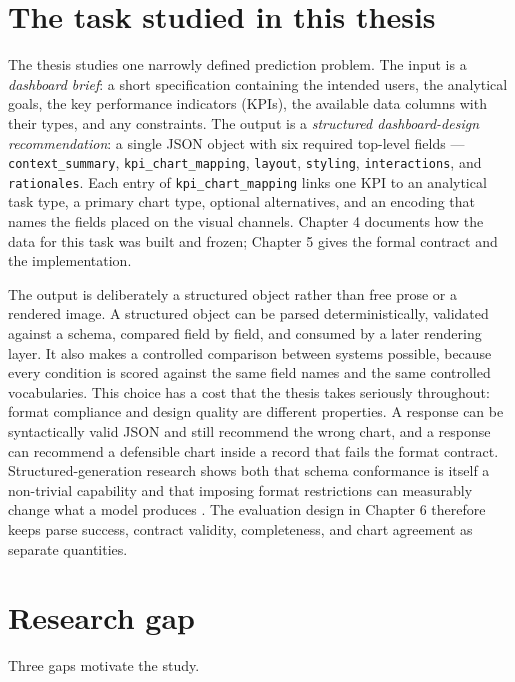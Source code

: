 \section{The task studied in this thesis}

The thesis studies one narrowly defined prediction problem. The input is a \emph{dashboard brief}: a short specification containing the intended users, the analytical goals, the key performance indicators (KPIs), the available data columns with their types, and any constraints. The output is a \emph{structured dashboard-design recommendation}: a single JSON object with six required top-level fields --- \texttt{context\_summary}, \texttt{kpi\_chart\_mapping}, \texttt{layout}, \texttt{styling}, \texttt{interactions}, and \texttt{rationales}. Each entry of \texttt{kpi\_chart\_mapping} links one KPI to an analytical task type, a primary chart type, optional alternatives, and an encoding that names the fields placed on the visual channels. Chapter 4 documents how the data for this task was built and frozen; Chapter 5 gives the formal contract and the implementation.

The output is deliberately a structured object rather than free prose or a rendered image. A structured object can be parsed deterministically, validated against a schema, compared field by field, and consumed by a later rendering layer. It also makes a controlled comparison between systems possible, because every condition is scored against the same field names and the same controlled vocabularies. This choice has a cost that the thesis takes seriously throughout: format compliance and design quality are different properties. A response can be syntactically valid JSON and still recommend the wrong chart, and a response can recommend a defensible chart inside a record that fails the format contract. Structured-generation research shows both that schema conformance is itself a non-trivial capability \cite{geng2025structured} and that imposing format restrictions can measurably change what a model produces \cite{tam2024formatrestrictions}. The evaluation design in Chapter 6 therefore keeps parse success, contract validity, completeness, and chart agreement as separate quantities.

\section{Research gap}

Three gaps motivate the study.

